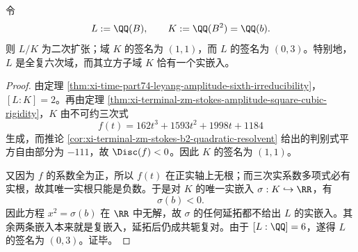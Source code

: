 \begin{corollary}\label{cor:xi-time-part74-leyang-amplitude-field-signature}
令
\[
L:=\QQ(B),
\qquad
K:=\QQ(B^2)=\QQ(b).
\]
则 \(L/K\) 为二次扩张；域 \(K\) 的签名为 \((1,1)\)，而 \(L\) 的签名为 \((0,3)\)。特别地，\(L\) 是全复六次域，而其立方子域 \(K\) 恰有一个实嵌入。
\end{corollary}
\begin{proof}
由定理 \ref{thm:xi-time-part74-leyang-amplitude-sixth-irreducibility}，\([L:K]=2\)。再由定理 \ref{thm:xi-terminal-zm-stokes-amplitude-square-cubic-rigidity}，\(K\) 由不可约三次式
\[
f(t)=162t^3+1593t^2+1998t+1184
\]
生成，而推论 \ref{cor:xi-terminal-zm-stokes-b2-quadratic-resolvent} 给出的判别式平方自由部分为 \(-111\)，故 \(\Disc(f)<0\)。因此 \(K\) 的签名为 \((1,1)\)。

又因为 \(f\) 的系数全为正，所以 \(f(t)\) 在正实轴上无根；而三次实系数多项式必有实根，故其唯一实根只能是负数。于是对 \(K\) 的唯一实嵌入 \(\sigma:K\hookrightarrow \RR\)，有
\[
\sigma(b)<0.
\]
因此方程 \(x^2=\sigma(b)\) 在 \(\RR\) 中无解，故 \(\sigma\) 的任何延拓都不给出 \(L\) 的实嵌入。其余两条嵌入本来就是复嵌入，延拓后仍成共轭复对。由于 \([L:\QQ]=6\)，遂得 \(L\) 的签名为 \((0,3)\)。证毕。
\end{proof}

